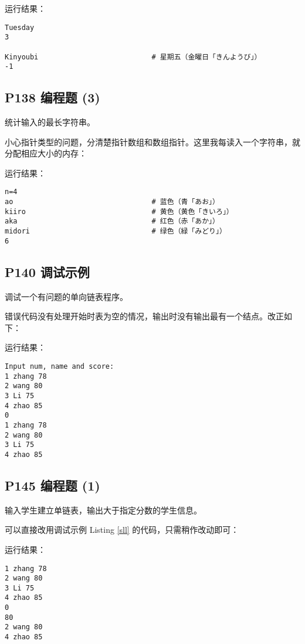 \documentclass[cs4size,a4paper,nofonts]{ctexart}
\begin{document}
运行结果：
\begin{verbatim}
Tuesday
3

Kinyoubi                           # 星期五（金曜日「きんようび」）
-1
\end{verbatim}

\subsection{P138 编程题 (3)}

统计输入的最长字符串。

小心指针类型的问题，分清楚指针数组和数组指针。这里我每读入一个字符串，就分配相应大小的内存：


运行结果：
\begin{verbatim}
n=4
ao                                 # 蓝色（青「あお」）
kiiro                              # 黄色（黄色「きいろ」）
aka                                # 红色（赤「あか」）
midori                             # 绿色（緑「みどり」）
6
\end{verbatim}

\subsection{P140 调试示例}

调试一个有问题的单向链表程序。

错误代码没有处理开始时表为空的情况，输出时没有输出最有一个结点。改正如下：


运行结果：
\begin{verbatim}
Input num, name and score:
1 zhang 78
2 wang 80
3 Li 75
4 zhao 85
0
1 zhang 78
2 wang 80
3 Li 75
4 zhao 85
\end{verbatim}

\subsection{P145 编程题 (1)}

输入学生建立单链表，输出大于指定分数的学生信息。

可以直接改用调试示例 Listing \ref{sll} 的代码，只需稍作改动即可：


运行结果：
\begin{verbatim}
1 zhang 78
2 wang 80
3 Li 75
4 zhao 85
0
80
2 wang 80
4 zhao 85
\end{verbatim}
\end{document}
